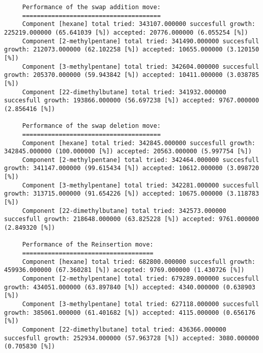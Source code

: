 \begin{tiny}
\begin{verbatim}
     Performance of the swap addition move:
     ======================================
     Component [hexane] total tried: 343107.000000 succesfull growth: 225219.000000 (65.641039 [%]) accepted: 20776.000000 (6.055254 [%])
     Component [2-methylpentane] total tried: 341490.000000 succesfull growth: 212073.000000 (62.102258 [%]) accepted: 10655.000000 (3.120150 [%])
     Component [3-methylpentane] total tried: 342604.000000 succesfull growth: 205370.000000 (59.943842 [%]) accepted: 10411.000000 (3.038785 [%])
     Component [22-dimethylbutane] total tried: 341932.000000 succesfull growth: 193866.000000 (56.697238 [%]) accepted: 9767.000000 (2.856416 [%])

     Performance of the swap deletion move:
     ======================================
     Component [hexane] total tried: 342845.000000 succesfull growth: 342845.000000 (100.000000 [%]) accepted: 20563.000000 (5.997754 [%])
     Component [2-methylpentane] total tried: 342464.000000 succesfull growth: 341147.000000 (99.615434 [%]) accepted: 10612.000000 (3.098720 [%])
     Component [3-methylpentane] total tried: 342281.000000 succesfull growth: 313715.000000 (91.654226 [%]) accepted: 10675.000000 (3.118783 [%])
     Component [22-dimethylbutane] total tried: 342573.000000 succesfull growth: 218648.000000 (63.825228 [%]) accepted: 9761.000000 (2.849320 [%])

     Performance of the Reinsertion move:
     ====================================
     Component [hexane] total tried: 682800.000000 succesfull growth: 459936.000000 (67.360281 [%]) accepted: 9769.000000 (1.430726 [%])
     Component [2-methylpentane] total tried: 679289.000000 succesfull growth: 434051.000000 (63.897840 [%]) accepted: 4340.000000 (0.638903 [%])
     Component [3-methylpentane] total tried: 627118.000000 succesfull growth: 385061.000000 (61.401682 [%]) accepted: 4115.000000 (0.656176 [%])
     Component [22-dimethylbutane] total tried: 436366.000000 succesfull growth: 252934.000000 (57.963728 [%]) accepted: 3080.000000 (0.705830 [%])
\end{verbatim}
\end{tiny}

